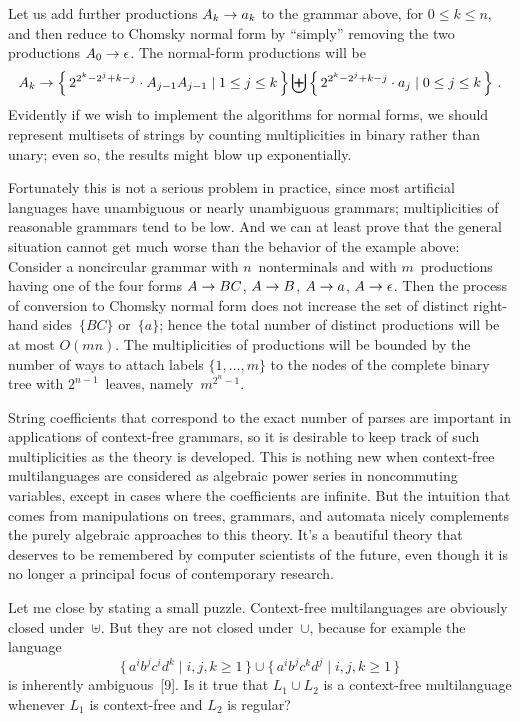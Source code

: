 Let us add further productions $A_k\rightarrow a_k$ to the grammar above, for
$0\leq k\leq n$, and then reduce to Chomsky normal form by ``simply''
removing the two productions $A_0\rightarrow\epsilon$. The normal-form
productions will be
$$A_k\rightarrow\left\{\,2^{2^k-2^j+k-j}\cdot A_{j-1}A_{j-1}\mid 1\leq j\leq
k\,\right\}
\biguplus\left\{\,2^{2^k-2^j+k-j}\cdot a_j\mid 0\leq j\leq k\,\right\}\,.$$
Evidently if we wish to implement the algorithms for normal forms, we
should represent multisets of strings by counting multiplicities in
binary rather than unary; even so, the results might blow up
exponentially. 

Fortunately this is not a serious problem in practice, since most
artificial languages have unambiguous or nearly unambiguous grammars;
multiplicities of reasonable grammars tend to be low. And we can at
least prove that the general situation cannot get much worse than the
behavior of the example above: Consider a noncircular grammar with
$n$~nonterminals and with $m$~productions having one of the four forms
$A\rightarrow BC$, $A\rightarrow B$, $A\rightarrow a$, $A\rightarrow \epsilon$. Then the process of
conversion to Chomsky normal form does not increase the set of
distinct right-hand sides~$\{BC\}$ or~$\{a\}$; hence the total number
of distinct productions will be at most $O(mn)$. The multiplicities of
productions will be bounded by the number of ways to attach labels
$\{1,\ldots,m\}$ to the nodes of the complete binary tree with
$2^{n-1}$~leaves, namely~$m^{2^n-1}$.

\enspace
String coefficients that correspond to the exact number of parses are
important in applications of context-free grammars, so it is desirable
to keep track of such multiplicities as the theory is developed. This
is nothing new when context-free multilanguages are considered as
algebraic power series in noncommuting variables, except in cases
where the coefficients are infinite. But the intuition that comes from
manipulations on trees, grammars, and automata nicely complements the
purely algebraic approaches to this theory. 
It's a beautiful theory that deserves to be remembered by computer
scientists of the future, even though it is no longer a principal
focus of contemporary research.

Let me close by stating a small puzzle. Context-free multilanguages
are obviously closed under~$\uplus$. But they are not closed
under~$\cup$, because for example the language 
$$\{\,a^ib^jc^id^k\mid
i,j,k\geq 1\,\}\cup\{\,a^ib^jc^kd^j\mid i,j,k\geq 1\,\}$$ 
is inherently ambiguous~[9].
Is it true that $L_1\cup L_2$ is a context-free multilanguage whenever
$L_1$ is context-free and $L_2$ is regular?

